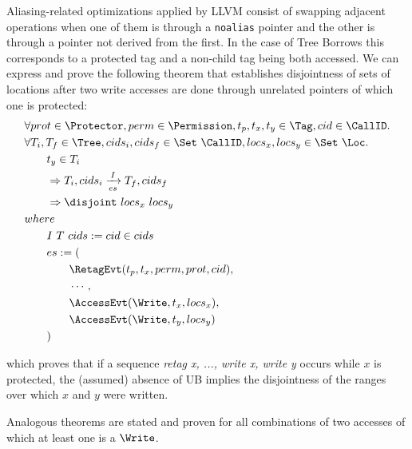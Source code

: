 \documentclass[a4paper,11pt]{article}
\theoremstyle{plain}
\theoremstyle{definition}
\theoremstyle{remark}
\begin{document}
Aliasing-related optimizations applied by LLVM consist of swapping adjacent operations
when one of them is through a \texttt{noalias} pointer and the other is through a
pointer not derived from the first. In the case of Tree Borrows this corresponds to
a protected tag and a non-child tag being both accessed.
We can express and prove the following theorem that establishes disjointness of sets of
locations after two write accesses are done through unrelated pointers of which one is
protected:
\begin{align*}
    &\forall prot\in\Protector, perm\in\Permission, t_p,t_x,t_y\in\Tag, cid\in\CallID.\\
    &\forall T_i,T_f\in\Tree, cids_i,cids_f\in\Set~\CallID, locs_x,locs_y\in\Set~\Loc.\\
    &\qquad t_y\in T_i \\
    &\qquad\Rightarrow T_i,cids_i \borseq{es}{I} T_f,cids_f \\
    &\qquad\Rightarrow \disjoint~locs_x~locs_y \\
    &where\\
    &\qquad I~T~cids := cid\in cids \\
    &\qquad es := (\\
    &\qquad\qquad \RetagEvt(t_p,t_x,perm,prot,cid),\\
    &\qquad\qquad \cdots, \\
    &\qquad\qquad \AccessEvt(\Write,t_x,locs_x), \\
    &\qquad\qquad \AccessEvt(\Write,t_y,locs_y) \\
    &\qquad)
\end{align*}

which proves that if a sequence \textit{retag x, ..., write x, write y} occurs
while \(x\) is protected, the (assumed) absence of UB implies the disjointness
of the ranges over which \(x\) and \(y\) were written.

Analogous theorems are stated and proven for all combinations of two accesses
of which at least one is a \(\Write\).

\end{document}
